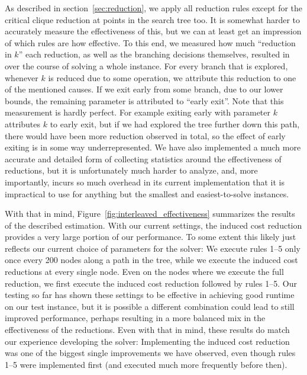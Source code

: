\documentclass[12pt,oneside,english,parskip=full,headings=small]{scrbook}
\theoremstyle{definition}
\begin{document}
As described in section~\ref{sec:reduction}, we apply all reduction rules except for the critical
clique reduction at points in the search tree too. It is somewhat harder to accurately measure the
effectiveness of this, but we can at least get an impression of which rules are how effective. To
this end, we measured how much ``reduction in $k$'' each reduction, as well as the branching
decisions themselves, resulted in over the course of solving a whole instance. For every branch that
is explored, whenever $k$ is reduced due to some operation, we attribute this reduction to one of
the mentioned causes. If we exit early from some branch, due to our lower bounds, the remaining
parameter is attributed to ``early exit''. Note that this measurement is hardly perfect. For example
exiting early with parameter $k$ attributes $k$ to early exit, but if we had explored the tree
further down this path, there would have been more reduction observed in total, so the effect of
early exiting is in some way underrepresented. We have also implemented a much more accurate and
detailed form of collecting statistics around the effectiveness of reductions, but it is
unfortunately much harder to analyze, and, more importantly, incurs so much overhead in its current
implementation that it is impractical to use for anything but the smallest and easiest-to-solve
instances.

With that in mind, Figure~\ref{fig:interleaved_effectiveness} summarizes the results of the
described estimation. With our current settings, the induced cost reduction provides a very large
portion of our performance. To some extent this likely just reflects our current choice of
parameters for the solver: We execute rules 1--5 only once every 200 nodes along a path in the tree,
while we execute the induced cost reductions at every single node. Even on the nodes where we
execute the full reduction, we first execute the induced cost reduction followed by rules 1--5. Our
testing so far has shown these settings to be effective in achieving good runtime on our test
instance, but it is possible a different combination could lead to still improved performance,
perhaps resulting in a more balanced mix in the effectiveness of the reductions. Even with that in
mind, these results do match our experience developing the solver: Implementing the induced cost
reduction was one of the biggest single improvements we have observed, even though rules 1--5 were
implemented first (and executed much more frequently before then).
\end{document}

